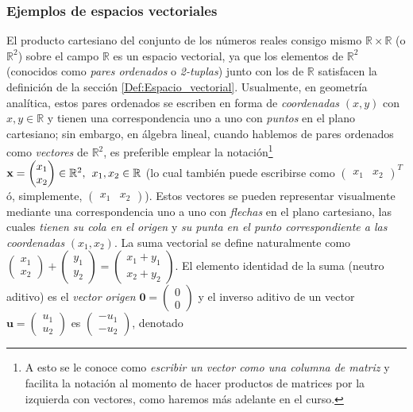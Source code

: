 \documentclass[apuntes]{subfiles}
\begin{document}
\subsubsection{Ejemplos de espacios vectoriales} \label{Ejem:Espacios_vectoriales}

El producto cartesiano del conjunto de los números reales consigo mismo $\mathbb{R}\times\mathbb{R}$ (o $\mathbb{R}^2$) sobre el campo $\mathbb{R}$ es un espacio vectorial, ya que los elementos de $\mathbb{R}^2$ (conocidos como \textit{pares ordenados} o \textit{2-tuplas}) junto con los de $\mathbb{R}$ satisfacen la definición de la sección \ref{Def:Espacio_vectorial}. Usualmente, en geometría analítica, estos pares ordenados se escriben en forma de \emph{coordenadas} $(x,y)$ con $x,y \in \mathbb{R}$ y tienen una correspondencia uno a uno con \emph{puntos} en el plano cartesiano; sin embargo, en álgebra lineal, cuando hablemos de pares ordenados como \emph{vectores} de $\mathbb{R}^2$, es preferible emplear la notación\footnote{A esto se le conoce como \emph{escribir un vector como una columna de matriz} y facilita la notación al momento de hacer productos de matrices por la izquierda con vectores, como haremos más adelante en el curso.} $\textbf{x}=\begin{pmatrix}x_1\\x_2\end{pmatrix}\in\mathbb{R}^2,\hspace{1.5mm}x_1,x_2\in\mathbb{R}$ (lo cual también puede escribirse como $\begin{pmatrix}x_1&x_2\end{pmatrix}^T$ ó, simplemente, $\begin{pmatrix}x_1&x_2\end{pmatrix}$). Estos vectores se pueden representar visualmente mediante una correspondencia uno a uno con \emph{flechas} en el plano cartesiano, las cuales \emph{tienen su cola en el origen} y \emph{su punta en el punto correspondiente a las coordenadas} $(x_1,x_2)$. La suma vectorial se define naturalmente como $\begin{pmatrix}x_1\\x_2\end{pmatrix}+\begin{pmatrix}y_1\\y_2\end{pmatrix}=\begin{pmatrix}x_1+y_1\\x_2+y_2\end{pmatrix}$. El elemento identidad de la suma (neutro aditivo) es el \emph{vector origen} $\mathbf{0}=\begin{pmatrix}0\\0\end{pmatrix}$ y el inverso aditivo de un vector $\mathbf{u}=\begin{pmatrix}u_1\\u_2\end{pmatrix}$ es $\begin{pmatrix}-u_1\\-u_2\end{pmatrix}$, denotado 
\end{document}
